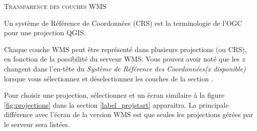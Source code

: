 \begin{Tip}[ht]\caption{\textsc{Transparence des couches WMS}}
\end{Tip}


Un syst\`eme de R\'ef\'erence de Coordonn\'ees (CRS) est la terminologie de l'OGC pour
une projection QGIS.

Chaque couche WMS peut \^etre repr\'esent\'e dans plusieurs projections (ou CRS), en
fonction de la possibilit\'e du serveur WMS. Vous pouvez avoir not\'e que les
\textsl{x} changent dans l'en-t\^ete du \textsl{Syst\`eme de R\'ef\'erence des
Coordonn\'ees(x disponible)} lorsque vous s\'electionnez et d\'eselectionnez les
couches de la section .

Pour choisir une projection, s\'electionnez  et un \'ecran
similaire \`a la figure \ref{fig:projections} dans la section
\ref{label_projstart} apparaitra. La principale diff\'erence avec l'\'ecran de la
version WMS est que seules les projections g\'er\'ees par le serveur sera list\'ees.

